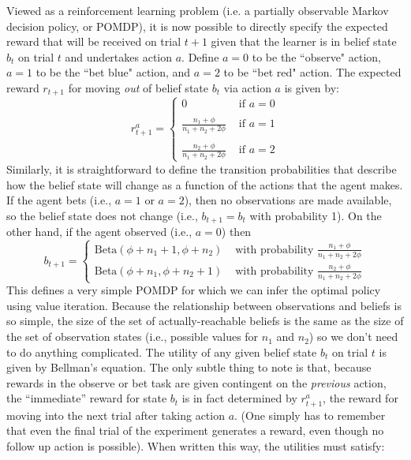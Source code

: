 \documentclass[authoryear]{elsarticle}
\begin{document}
Viewed as a reinforcement learning problem (i.e. a partially observable Markov decision policy, or POMDP), it is now possible to directly specify the expected reward that will be received on trial $t+1$ given that the learner is in belief state $b_t$ on trial $t$ and undertakes action $a$. Define $a=0$ to be the ``observe" action, $a=1$ to be the ``bet blue" action, and $a=2$ to be ``bet red" action. The expected reward $r_{t+1}$ for moving {\it out} of belief state $b_t$ via action $a$ is given by:
$$
r_{t+1}^a = \left\{ \begin{array}{rl} 0 & \mbox{ if } a=0 \\ \\ \frac{n_1 + \phi}{n_1+n_2+2\phi} & \mbox{ if } a=1 \\ \\ \frac{n_2 + \phi}{n_1+n_2+2\phi} & \mbox{ if } a=2 \end{array} \right.
$$
Similarly, it is straightforward to define the transition probabilities that describe how the belief state will change as a function of the actions that the agent makes. If the agent bets (i.e., $a=1$ or $a=2$), then no observations are made available, so the belief state does not change (i.e., $b_{t+1} = b_t$ with probability 1). On the other hand, if the agent observed (i.e., $a=0$) then
$$
b_{t+1} = \left\{
\begin{array}{rl}
\mbox{Beta}(\phi + n_1 + 1, \phi + n_2 ) & \mbox{ with probability } \frac{n_1 + \phi}{n_1+n_2+2\phi} \\ \mbox{Beta}(\phi + n_1, \phi + n_2 + 1 ) & \mbox{ with probability } \frac{n_2 + \phi}{n_1+n_2+2\phi}
\end{array}
\right.
$$
This defines a very simple POMDP for which we can infer the optimal policy using value iteration. Because the relationship between observations and beliefs is so simple, the size of the set of actually-reachable beliefs is the same as the size of the set of observation states (i.e., possible values for $n_1$ and $n_2$) so we don't need to do anything complicated. The utility of any given belief state $b_t$ on trial $t$ is given by Bellman's equation. The only subtle thing to note is that, because rewards in the observe or bet task are given contingent on the {\it previous} action, the ``immediate'' reward for state $b_t$ is in fact determined by $r_{t+1}^a$, the reward for moving into the next trial after taking action $a$. (One simply has to remember that even the final trial of the experiment generates a reward, even though no follow up action is possible). When written this way, the utilities must satisfy:
\end{document}
